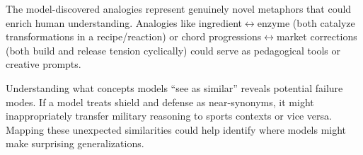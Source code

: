 The model-discovered analogies represent genuinely novel metaphors that could enrich human understanding.
Analogies like ingredient$\leftrightarrow$enzyme (both catalyze transformations in a recipe/reaction) or chord progressions$\leftrightarrow$market corrections (both build and release tension cyclically) could serve as pedagogical tools or creative prompts.

Understanding what concepts models ``see as similar'' reveals potential failure modes.
If a model treats shield and defense as near-synonyms, it might inappropriately transfer military reasoning to sports contexts or vice versa.
Mapping these unexpected similarities could help identify where models might make surprising generalizations.
